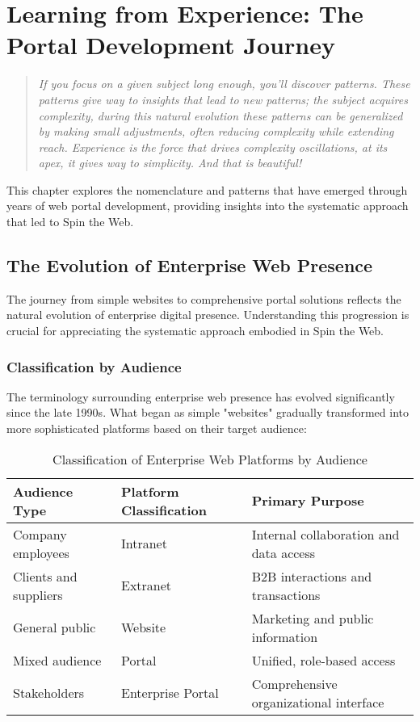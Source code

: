 
\chapter{Learning from Experience: The Portal Development Journey}
\label{chap:learning}

\begin{quote}
\textit{If you focus on a given subject long enough, you'll discover patterns. These patterns give way to insights that lead to new patterns; the subject acquires complexity, during this natural evolution these patterns can be generalized by making small adjustments, often reducing complexity while extending reach. Experience is the force that drives complexity oscillations, at its apex, it gives way to simplicity. And that is beautiful!}
\end{quote}

This chapter explores the nomenclature and patterns that have emerged through years of web portal development, providing insights into the systematic approach that led to Spin the Web.

\section{The Evolution of Enterprise Web Presence}

The journey from simple websites to comprehensive portal solutions reflects the natural evolution of enterprise digital presence. Understanding this progression is crucial for appreciating the systematic approach embodied in Spin the Web.

\subsection{Classification by Audience}

The terminology surrounding enterprise web presence has evolved significantly since the late 1990s. What began as simple "websites" gradually transformed into more sophisticated platforms based on their target audience:

\begin{table}[htbp]
\centering
\caption{Classification of Enterprise Web Platforms by Audience}
\label{tab:audience-classification}
\begin{tabular}{|l|l|l|}
\hline
\textbf{Audience Type} & \textbf{Platform Classification} & \textbf{Primary Purpose} \\
\hline
Company employees & Intranet & Internal collaboration and data access \\
\hline
Clients and suppliers & Extranet & B2B interactions and transactions \\
\hline
General public & Website & Marketing and public information \\
\hline
Mixed audience & Portal & Unified, role-based access \\
\hline
Stakeholders & Enterprise Portal & Comprehensive organizational interface \\
\hline
\end{tabular}
\end{table}

